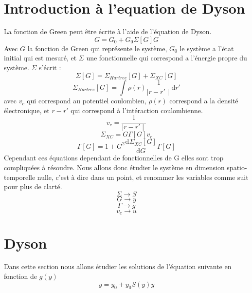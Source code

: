 \documentclass[12pt]{article}
\begin{document}
\section{Introduction \`a l'equation de Dyson}
La fonction de Green peut \^etre \'ecrite \`a l'aide de l'\'equation de Dyson. 
\begin{equation}
	G = G_0 + G_0 \Sigma[G] G
\end{equation}
Avec $G$ la fonction de Green qui repr\'esente le syst\`eme, $G_0$ le syst\`eme a l'\'etat initial qui est mesur\'e, et $\Sigma$ une fonctionnelle qui correspond a l'\'energie propre du syst\`eme.
$\Sigma$ s'\'ecrit :
\begin{equation}
	\Sigma[G] = \Sigma_{Hartree}[G] + \Sigma_{XC}[G]
\end{equation}
\begin{equation}
	\Sigma_{Hartree}[G] = \int \rho(r) \frac{1}{\mid r - r'\mid }\mathrm{d}r' 
\end{equation}
avec $v_c$ qui correspond au potentiel coulombien, $\rho(r)$ correspond a la densit\'e \'electronique, et $r-r'$
qui correspond à l'int\'eraction coulombienne.
\begin{equation}
	v_c =  \frac{1}{\mid r - r'\mid }
\end{equation}
\begin{equation}
	\Sigma_{XC} = G \Gamma[G] v_c
\end{equation}
\begin{equation}
	\Gamma[G] = 1 + G^2 \frac{\mathrm{d} \Sigma_{XC}[G]}{\mathrm{d}G} \Gamma[G]
\end{equation}
Cependant ces \'equations dependant de fonctionnelles de G elles sont trop compliqu\'ees \`a r\'esoudre. 
Nous allons donc \'etudier le syst\`eme en dimension spatio-temporelle nulle, c'est \`a dire dans un point, et renommer les variables comme suit
pour plus de clart\'e.
\begin{equation}
	\Sigma \longrightarrow S
\end{equation}
\begin{equation}
	G \longrightarrow y
\end{equation}
\begin{equation}
	\Gamma \longrightarrow g
\end{equation}
\begin{equation}
	v_c \longrightarrow u
\end{equation}
\section{Dyson}
Dans cette section nous allons \'etudier les solutions de l'\'equation suivante en fonction de $g(y)$
\begin{equation}
\label{dyson}
	y = y_0 + y_0 S(y) y
\end{equation}
\end{document}
